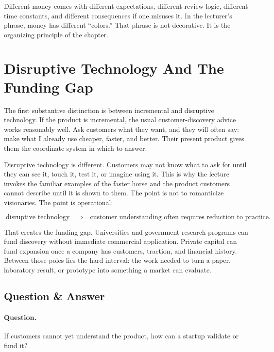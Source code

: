 Different money comes with different expectations, different review logic, different time constants, and different consequences if one misuses it. In the lecturer's phrase, money has different ``colors.'' That phrase is not decorative. It is the organizing principle of the chapter.

\section{Disruptive Technology And The Funding Gap}

The first substantive distinction is between incremental and disruptive technology. If the product is incremental, the usual customer-discovery advice works reasonably well. Ask customers what they want, and they will often say: make what I already use cheaper, faster, and better. Their present product gives them the coordinate system in which to answer.

Disruptive technology is different. Customers may not know what to ask for until they can see it, touch it, test it, or imagine using it. This is why the lecture invokes the familiar examples of the faster horse and the product customers cannot describe until it is shown to them. The point is not to romanticize visionaries. The point is operational:

\begin{equation}
\text{disruptive technology}
\quad\Longrightarrow\quad
\text{customer understanding often requires reduction to practice.}
\end{equation}

That creates the funding gap. Universities and government research programs can fund discovery without immediate commercial application. Private capital can fund expansion once a company has customers, traction, and financial history. Between those poles lies the hard interval: the work needed to turn a paper, laboratory result, or prototype into something a market can evaluate.

\subsection{Question \& Answer}

\paragraph{Question.}
If customers cannot yet understand the product, how can a startup validate or fund it?

